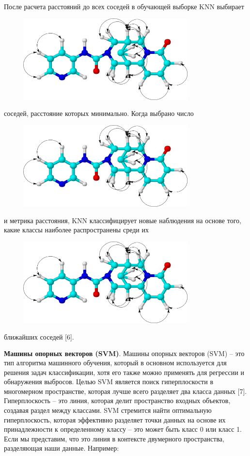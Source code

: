 После расчета расстояний до всех соседей в обучающей выборке KNN
выбирает \begin{figure}[H]
	\centering
	\includegraphics[width=0.8\textwidth]{assets/11}
	\caption*{}
\end{figure} соседей, расстояние которых
минимально. Когда выбрано число \begin{figure}[H]
	\centering
	\includegraphics[width=0.8\textwidth]{assets/11}
	\caption*{}
\end{figure} и
метрика расстояния, KNN классифицирует новые наблюдения на основе того,
какие классы наиболее распространены среди их
\begin{figure}[H]
	\centering
	\includegraphics[width=0.8\textwidth]{assets/11}
	\caption*{}
\end{figure} ближайших соседей {[}6{]}.

{\bfseries Машины опорных векторов (SVM)}. Машины опорных векторов (SVM) --
это тип алгоритма машинного обучения, который в основном используется
для решения задач классификации, хотя его также можно применять для
регрессии и обнаружения выбросов. Целью SVM является поиск
гиперплоскости в многомерном пространстве, которая лучше всего разделяет
два класса данных {[}7{]}. Гиперплоскость -- это линия, которая делит
пространство входных объектов, создавая раздел между классами. SVM
стремится найти оптимальную гиперплоскость, которая эффективно разделяет
точки данных на основе их принадлежности к определенному классу -- это
может быть класс 0 или класс 1. Если мы представим, что это линия в
контексте двумерного пространства, разделяющая наши данные. Например:

